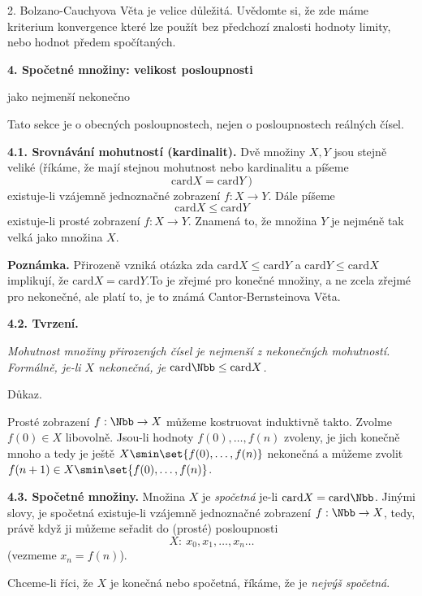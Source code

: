 \documentclass[12pt]{article}
\begin{document}
 2. Bolzano-Cauchyova Věta je velice důležitá. Uvědomte si, že zde máme kriterium konvergence které lze použít bez předchozí znalosti hodnoty limity, nebo hodnot předem spočítaných.
 
 
   
 \vskip10mm
 
  {\large\bf 4. Spočetné množiny: velikost posloupnosti
  
  \hskip7mm jako nejmenší nekonečno}
 
 \bigskip
 
 \def\card{\text{card}}
 
Tato sekce je o obecných posloupnostech, nejen o posloupnostech reálných čísel.

\bigskip
 
 {\bf 4.1. Srovnávání mohutností (kardinalit).}  Dvě množiny $X,Y$ jsou stejně veliké (říkáme, že mají stejnou mohutnost nebo kardinalitu a píšeme
 $$
 \card X=\card Y \ )
 $$
existuje-li vzájemně jednoznačné zobrazení $f:X\to Y$. Dále píšeme
 $$
 \card X\leq \card Y
 $$
existuje-li prosté zobrazení $f:X\to Y$. Znamená to, že množina $Y$ je nejméně tak velká jako množina $X$.
 
 \medskip
 
 {\bf Poznámka.} Přirozeně vzniká otázka zda $\card X\leq \card Y$ a $\card Y\leq \card X$
 implikují, že $\card X= \card Y$.To je zřejmé pro konečné množiny, a ne zcela zřejmé pro nekonečné, ale platí to, je to známá
 Cantor-Bernsteinova Věta.
 
 \bigskip
 
 {\bf 4.2. Tvrzení.} {\em Mohutnost množiny přirozených čísel je nejmenší z nekonečných mohutností. Formálně,
 je-li $X$ nekonečná, je $\card\Nbb\leq \card X$.
 
 Důkaz.} Prosté zobrazení $f:\Nbb\to X$ můžeme kostruovat induktivně takto. Zvolme $f(0)\in X$ libovolně.
 Jsou-li hodnoty $f(0),\dots,f(n)$ zvoleny, je jich konečně mnoho a tedy je ještě $X\smin\set{f(0),\dots,f(n)}$ nekonečná
a můžeme zvolit $f(n+1)\in X\smin\set{f(0),\dots,f(n)}$.\sq
 
 \bigskip
 
 {\bf 4.3. Spočetné množiny.} Množina $X$ je  {\em spočetná} je-li $\card X=\card\Nbb$. Jinými slovy, je spočetná existuje-li vzájemně jednoznačné zobrazení $f:\Nbb\to X$, tedy, právě když ji můžeme seřadit do (prosté) posloupnosti
 $$
 X:\ x_0,x_1,\dots,x_n\dots
 $$
 (vezmeme $x_n=f(n)$).
 
Chceme-li říci, že $X$ je konečná nebo spočetná, říkáme, že je {\em nejvýš spočetná}.
 
\end{document}
